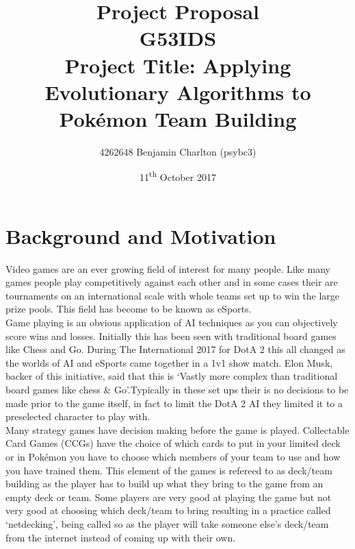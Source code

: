 \documentclass[a4paper]{article}
\newcommand{\Pokemon}{Pok\'{e}mon}
\begin{document}
\title{
    Project Proposal
    \\ \large{G53IDS}
    \\ \large{Project Title: Applying Evolutionary Algorithms to \Pokemon{} Team Building}\vspace{-3ex}}
\author{4262648 Benjamin Charlton (psybc3)}
\date{\vspace{-2ex}11\textsuperscript{th} October 2017}
\maketitle

\section{Background and Motivation}
Video games are an ever growing field of interest for many people. Like many games people play competitively against each other and in some cases their are tournaments on an international scale with whole teams set up to win the large prize pools\cite{eSportsPrize}\cite{teamEarnings}. This field has become to be known as eSports.\\
Game playing is an obvious application of AI techniques as you can objectively score wins and losses. Initially this has been seen with traditional board games like Chess\cite{deepBlue} and Go\cite{alphaGo}. During The International 2017 for DotA 2 this all changed as the worlds of AI and eSports came together in a 1v1 show match\cite{openAI}. Elon Musk, backer of this initiative, said that this is `Vastly more complex than traditional board games like chess \& Go'\cite{openAI}.Typically in these set ups their is no decisions to be made prior to the game itself, in fact to limit the DotA 2 AI they limited it to a preselected character to play with.\\
Many strategy games have decision making before the game is played. Collectable Card Games (CCGs) have the choice of which cards to put in your limited deck or in \Pokemon{} you have to choose which members of your team to use and how you have trained them. This element of the games is refereed to as deck/team building as the player has to build up what they bring to the game from an empty deck or team. Some players are very good at playing the game but not very good at choosing which deck/team to bring resulting in a practice called `netdecking', being called so as the player will take someone else's deck/team from the internet instead of coming up with their own.\\
\end{document}
